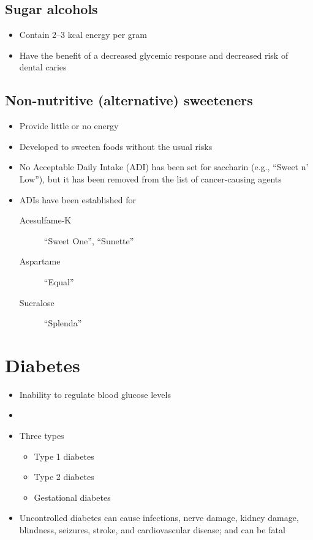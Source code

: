 \documentclass[title={Chapter 4}]{fdsn201notes}
\begin{document}
\subsection{Sugar alcohols}\label{subsec:sugar-alcohols}
\begin{itemize}
	\item Contain 2--3 kcal energy per gram
	\item Have the benefit of a decreased glycemic response and decreased risk of dental caries
\end{itemize}

\subsection{Non-nutritive (alternative) sweeteners}\label{subsec:non-nutritive-(alternative)-sweeteners}
\begin{itemize}
	\item Provide little or no energy
	\item Developed to sweeten foods without the usual risks
\end{itemize}

\begin{itemize}
	\item No Acceptable Daily Intake (ADI) has been set for saccharin (e.g., ``Sweet n' Low''), but it has been removed from the list of cancer-causing agents
	\item ADIs have been established for
	\begin{description}
		\item[Acesulfame-K] ``Sweet One'', ``Sunette''
		\item[Aspartame] ``Equal''
		\item[Sucralose] ``Splenda''
	\end{description}
\end{itemize}

\section{Diabetes}\label{sec:diabetes}
\begin{itemize}
	\item Inability to regulate blood glucose levels
	\item {}
	\item Three types
	\begin{itemize}
		\item Type 1 diabetes
		\item Type 2 diabetes
		\item Gestational diabetes
	\end{itemize}
	\item Uncontrolled diabetes can cause infections, nerve damage, kidney damage, blindness, seizures, stroke, and cardiovascular disease; and can be fatal
\end{itemize}
\end{document}
